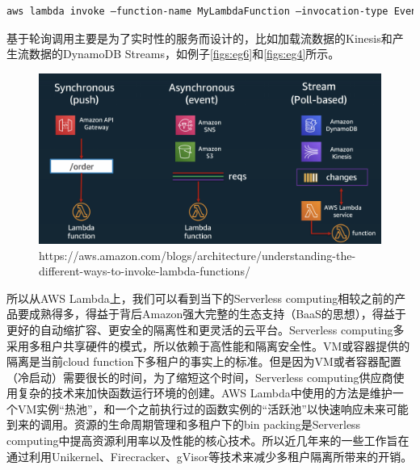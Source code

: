 \documentclass[11pt]{article}
\begin{document}
\begin{lstlisting}[language=bash]
aws lambda invoke —function-name MyLambdaFunction —invocation-type Event —payload  “[JSON string here]”
\end{lstlisting}
基于轮询调用主要是为了实时性的服务而设计的，比如加载流数据的Kinesis和产生流数据的DynamoDB Streams，如例子\ref{figs:eg6}和\ref{figs:eg4}所示。
\begin{figure}[!htbp]
	\centering
	\includegraphics[width=\linewidth]{figs/invoke}
	\caption{https://aws.amazon.com/blogs/architecture/understanding-the-different-ways-to-invoke-lambda-functions/}
	\label{figs:invoke}
\end{figure}

所以从AWS Lambda上，我们可以看到当下的Serverless computing相较之前的产品要成熟得多，得益于背后Amazon强大完整的生态支持（BaaS的思想），得益于更好的自动缩扩容、更安全的隔离性和更灵活的云平台。Serverless computing多采用多租户共享硬件的模式，所以依赖于高性能和隔离安全性。VM或容器提供的隔离是当前cloud function下多租户的事实上的标准。但是因为VM或者容器配置（冷启动）需要很长的时间，为了缩短这个时间，Serverless computing供应商使用复杂的技术来加快函数运行环境的创建。AWS Lambda中使用的方法是维护一个VM实例``热池''，和一个之前执行过的函数实例的``活跃池''以快速响应未来可能到来的调用\cite{jonas2019cloud}。资源的生命周期管理和多租户下的bin packing是Serverless computing中提高资源利用率以及性能的核心技术。所以近几年来的一些工作旨在通过利用Unikernel、Firecracker、gVisor等技术来减少多租户隔离所带来的开销。
\end{document}
